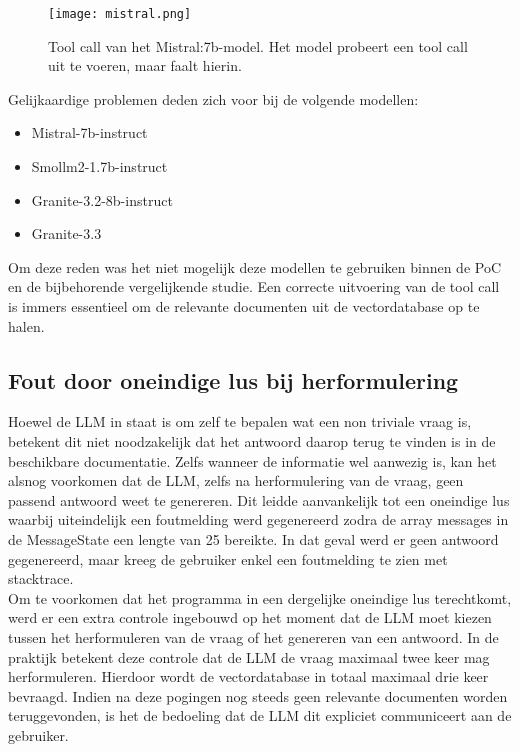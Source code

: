 \begin{figure}[H]
    \texttt{[image: mistral.png]}
    \caption{Tool call van het Mistral:7b-model. Het model probeert een tool call uit te voeren, maar faalt hierin.}
    \label{fig:tool_call_Mistral}
\end{figure}

Gelijkaardige problemen deden zich voor bij de volgende modellen:
\begin{itemize}
    \item Mistral-7b-instruct
    \item Smollm2-1.7b-instruct
    \item Granite-3.2-8b-instruct
    \item Granite-3.3
\end{itemize}

Om deze reden was het niet mogelijk deze modellen te gebruiken binnen de PoC en de bijbehorende vergelijkende studie. Een correcte uitvoering van de tool call is immers essentieel om de relevante documenten uit de vectordatabase op te halen.

\subsection{Fout door oneindige lus bij herformulering}

Hoewel de LLM in staat is om zelf te bepalen wat een non triviale vraag is, betekent dit niet noodzakelijk dat het antwoord daarop terug te vinden is in de beschikbare documentatie. Zelfs wanneer de informatie wel aanwezig is, kan het alsnog voorkomen dat de LLM, zelfs na herformulering van de vraag, geen passend antwoord weet te genereren. Dit leidde aanvankelijk tot een oneindige lus waarbij uiteindelijk een foutmelding werd gegenereerd zodra de array messages in de MessageState een lengte van 25 bereikte. In dat geval werd er geen antwoord gegenereerd, maar kreeg de gebruiker enkel een foutmelding te zien met stacktrace.
\\[1em]
Om te voorkomen dat het programma in een dergelijke oneindige lus terechtkomt, werd er een extra controle ingebouwd op het moment dat de LLM moet kiezen tussen het herformuleren van de vraag of het genereren van een antwoord. In de praktijk betekent deze controle dat de LLM de vraag maximaal twee keer mag herformuleren. Hierdoor wordt de vectordatabase in totaal maximaal drie keer bevraagd. Indien na deze pogingen nog steeds geen relevante documenten worden teruggevonden, is het de bedoeling dat de LLM dit expliciet communiceert aan de gebruiker. 

